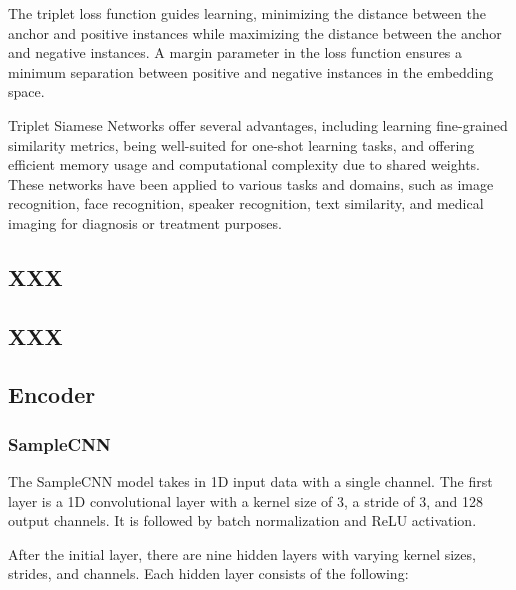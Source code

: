 The triplet loss function guides learning, minimizing the distance between the anchor and positive instances while maximizing the distance between the anchor and negative instances. A margin parameter in the loss function ensures a minimum separation between positive and negative instances in the embedding space.

Triplet Siamese Networks offer several advantages, including learning fine-grained similarity metrics, being well-suited for one-shot learning tasks, and offering efficient memory usage and computational complexity due to shared weights. These networks have been applied to various tasks and domains, such as image recognition, face recognition, speaker recognition, text similarity, and medical imaging for diagnosis or treatment purposes.

\subsection{XXX}
\subsection{XXX}

\subsection{Encoder}
\subsubsection{SampleCNN}

The SampleCNN model \cite{CLMR2021} takes in 1D input data with a single channel. The first layer is a 1D convolutional layer with a kernel size of 3, a stride of 3, and 128 output channels. It is followed by batch normalization and ReLU activation.

After the initial layer, there are nine hidden layers with varying kernel sizes, strides, and channels. Each hidden layer consists of the following:

